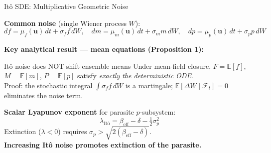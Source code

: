 \documentclass{beamer}
\newcommand{\E}{\mathbb{E}}
\newcommand{\half}{\tfrac{1}{2}}
\begin{document}
\begin{frame}{It\^{o} SDE: Multiplicative Geometric Noise}

    \footnotesize

    \textbf{Common noise} (single Wiener process $W$):
  \[
    df = \mu_f(\mathbf{u})\,dt + \sigma_f f\,dW, \quad
    dm = \mu_m(\mathbf{u})\,dt + \sigma_m m\,dW, \quad
    dp = \mu_p(\mathbf{u})\,dt + \sigma_p p\,dW
  \]

  \vspace{0.2cm}
  \textbf{Key analytical result — mean equations (Proposition 1):}

  \begin{block}{It\^{o} noise does NOT shift ensemble means}
    Under mean-field closure, $F = \E[f]$, $M = \E[m]$, $P = \E[p]$ satisfy
    \emph{exactly the deterministic ODE}.\\[4pt]
    Proof: the stochastic integral $\int \sigma_f f\,dW$ is a martingale;
    $\E[\Delta W \mid \mathcal{F}_t] = 0$ eliminates the noise term.
  \end{block}

  \vspace{0.3cm}
  \textbf{Scalar Lyapunov exponent} for parasite $p$-subsystem:
  \[
    \lambda_{\text{It\^{o}}} = \beta_{\text{eff}} - \delta - \half\sigma_p^2
  \]
  Extinction ($\lambda < 0$) requires $\sigma_p > \sqrt{2(\beta_{\text{eff}}-\delta)}$.\\
  \textbf{Increasing It\^{o} noise promotes extinction of the parasite.}

\end{frame}
\end{document}
